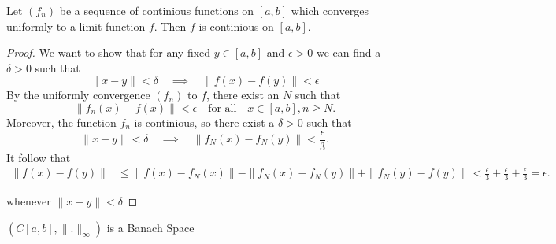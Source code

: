 \documentclass{article}
\theoremstyle{remark}
\begin{document}
\begin{theorem}
  Let $\left( f_n \right) $ be a sequence of continious functions on $[a,b]$ which converges uniformly to a limit function $f$. Then $f$ is continious on $[a,b]$.
\end{theorem}

\begin{proof}
  We want to show that for any fixed $y \in [a,b]$ and $\epsilon > 0$ we can find a $\delta > 0 $ such that \[
    \|x-y\| < \delta \quad \implies \quad \|f\left( x \right) - f\left( y \right) \| < \epsilon 
  \] By the uniformly convergence $\left( f_n \right) $ to $f$, there exist an $N$ such that \[
  \|f_n\left( x \right) - f\left( x \right) \| < \epsilon \quad \text{for all} \quad x \in [a,b], n\ge N. 
  \] 
  Moreover, the function $f_n$ is continious, so there exist a $\delta >0 $ such that \[
    \|x-y\| < \delta \quad \implies \quad \|f_N\left( x \right) - f_N\left( y \right) \| < \frac{\epsilon}{3}. 
  \] 
  It follow that 
  \begin{align*}
    \|f\left( x \right) - f\left( y \right) \| &\le \|f\left( x \right) - f_N\left( x \right) \| - \|f_N\left( x \right) - f_N\left( y \right) \| + \|f_N\left( y \right) - f\left( y \right) \|
                                               < \frac{\epsilon}{3} + \frac{\epsilon}{3} + \frac{\epsilon}{3} = \epsilon
  .\end{align*}

  whenever $\|x-y\| < \delta$
\end{proof}


\begin{theorem}
  $\left( C[a,b] , \|.\|_{\infty} \right) $ is a Banach Space 
\end{theorem}
\end{document}
